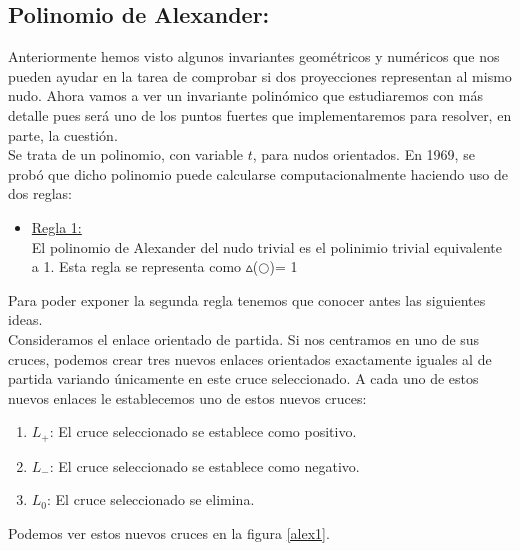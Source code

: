 \bigskip
\begin{center}
	\item \subsection{Polinomio de Alexander:}\label{alenudos}
\end{center}
Anteriormente hemos visto algunos invariantes geométricos y numéricos que nos pueden ayudar en la tarea de comprobar si dos proyecciones representan al mismo nudo. Ahora vamos a ver un invariante polinómico que estudiaremos con más detalle pues será uno de los puntos fuertes que implementaremos para resolver, en parte, la cuestión. \\

Se trata de un polinomio, con variable $t$, para nudos orientados. En 1969, se probó que dicho polinomio puede calcularse computacionalmente haciendo uso de dos reglas:
\begin{itemize}
	\item \underline{Regla 1:} \\
	El polinomio de Alexander del nudo trivial es el polinimio trivial equivalente a 1. Esta regla se representa como $\vartriangle$($\bigcirc$)= 1
\end{itemize}

Para poder exponer la segunda regla tenemos que conocer antes las siguientes ideas. \\
Consideramos el enlace orientado de partida. Si nos centramos en uno de sus cruces, podemos crear tres nuevos enlaces orientados exactamente iguales al de partida variando únicamente en este cruce seleccionado. A cada uno de estos nuevos enlaces le establecemos uno de estos nuevos cruces:
\begin{enumerate}
	\item $L_{+}$: El cruce seleccionado se establece como positivo.
	\item $L_{-}$: El cruce seleccionado se establece como negativo.
	\item $L_{0}$: El cruce seleccionado se elimina.
\end{enumerate}
Podemos ver estos nuevos cruces en la figura \ref{alex1}.\\

